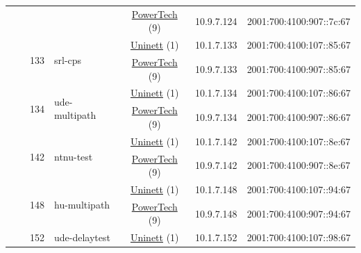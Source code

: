 \begin{small}
\begin{center}
\begin{longtable}{|c|c|c|c|c|c|c|c|}
  &  &  &  & \multicolumn{2}{|c|}{\tiny{\href{http://www.powertech.no}{PowerTech} (9)}} & \tiny{10.9.7.124} & \tiny{2001:700:4100:907::7c:67} \\* \cline{3-3}\cline{4-4}\cline{5-5}\cline{6-6}\cline{7-7}\cline{8-8}
  &  & \multirow{2}{*}{\tiny{133}} & \multicolumn{1}{|l|}{\multirow{2}{*}{\tiny{srl-cps}}} & \multicolumn{2}{|c|}{\tiny{\href{https://www.uninett.no}{Uninett} (1)}} & \tiny{10.1.7.133} & \tiny{2001:700:4100:107::85:67} \\* \cline{5-5}\cline{6-6}\cline{7-7}\cline{8-8}
  &  &  &  & \multicolumn{2}{|c|}{\tiny{\href{http://www.powertech.no}{PowerTech} (9)}} & \tiny{10.9.7.133} & \tiny{2001:700:4100:907::85:67} \\* \cline{3-3}\cline{4-4}\cline{5-5}\cline{6-6}\cline{7-7}\cline{8-8}
  &  & \multirow{2}{*}{\tiny{134}} & \multicolumn{1}{|l|}{\multirow{2}{*}{\tiny{ude-multipath}}} & \multicolumn{2}{|c|}{\tiny{\href{https://www.uninett.no}{Uninett} (1)}} & \tiny{10.1.7.134} & \tiny{2001:700:4100:107::86:67} \\* \cline{5-5}\cline{6-6}\cline{7-7}\cline{8-8}
  &  &  &  & \multicolumn{2}{|c|}{\tiny{\href{http://www.powertech.no}{PowerTech} (9)}} & \tiny{10.9.7.134} & \tiny{2001:700:4100:907::86:67} \\* \cline{3-3}\cline{4-4}\cline{5-5}\cline{6-6}\cline{7-7}\cline{8-8}
  &  & \multirow{2}{*}{\tiny{142}} & \multicolumn{1}{|l|}{\multirow{2}{*}{\tiny{ntnu-test}}} & \multicolumn{2}{|c|}{\tiny{\href{https://www.uninett.no}{Uninett} (1)}} & \tiny{10.1.7.142} & \tiny{2001:700:4100:107::8e:67} \\* \cline{5-5}\cline{6-6}\cline{7-7}\cline{8-8}
  &  &  &  & \multicolumn{2}{|c|}{\tiny{\href{http://www.powertech.no}{PowerTech} (9)}} & \tiny{10.9.7.142} & \tiny{2001:700:4100:907::8e:67} \\* \cline{3-3}\cline{4-4}\cline{5-5}\cline{6-6}\cline{7-7}\cline{8-8}
  &  & \multirow{2}{*}{\tiny{148}} & \multicolumn{1}{|l|}{\multirow{2}{*}{\tiny{hu-multipath}}} & \multicolumn{2}{|c|}{\tiny{\href{https://www.uninett.no}{Uninett} (1)}} & \tiny{10.1.7.148} & \tiny{2001:700:4100:107::94:67} \\* \cline{5-5}\cline{6-6}\cline{7-7}\cline{8-8}
  &  &  &  & \multicolumn{2}{|c|}{\tiny{\href{http://www.powertech.no}{PowerTech} (9)}} & \tiny{10.9.7.148} & \tiny{2001:700:4100:907::94:67} \\* \cline{3-3}\cline{4-4}\cline{5-5}\cline{6-6}\cline{7-7}\cline{8-8}
  &  & \multirow{2}{*}{\tiny{152}} & \multicolumn{1}{|l|}{\multirow{2}{*}{\tiny{ude-delaytest}}} & \multicolumn{2}{|c|}{\tiny{\href{https://www.uninett.no}{Uninett} (1)}} & \tiny{10.1.7.152} & \tiny{2001:700:4100:107::98:67} \\* \cline{5-5}\cline{6-6}\cline{7-7}\cline{8-8}

\end{longtable}
\end{center}
\end{small}
